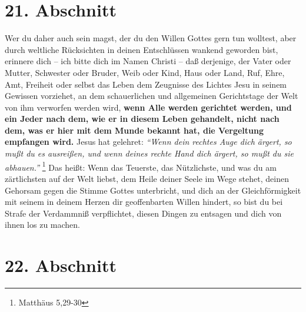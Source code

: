 \section{21. Abschnitt} \label{kap4_ab21}

Wer du daher auch sein magst, der du den Willen Gottes gern tun wolltest, aber
durch weltliche Rücksichten in deinen Entschlüssen wankend geworden bist,
erinnere dich -- ich bitte dich im Namen Christi -- daß derjenige, der Vater oder
Mutter, Schwester oder Bruder, Weib oder Kind, Haus oder Land, Ruf, Ehre, Amt,
Freiheit oder selbst das Leben dem Zeugnisse des Lichtes Jesu  in seinem
Gewissen vorziehet, an dem schauerlichen und allgemeinen Gerichtstage  der Welt
von ihm verworfen werden wird, \textbf{wenn Alle werden gerichtet werden, und
ein Jeder
nach dem, wie er in diesem Leben gehandelt, nicht nach dem, was er hier mit dem
Munde bekannt  hat, die Vergeltung empfangen wird.} Jesus hat gelehret:
\textit{"`Wenn
dein rechtes Auge dich ärgert, so mußt du es ausreißen, und wenn deines rechte
Hand dich ärgert, so mußt du sie abhauen."'}
\footnote{Matthäus  5,29-30}
Das heißt:
Wenn das Teuerste, das Nützlichste, und was du am zärtlichsten auf der Welt
liebst, dem Heile deiner Seele im Wege stehet, deinen Gehorsam gegen die Stimme
Gottes unterbricht, und dich an der Gleichförmigkeit mit seinem in deinem Herzen
dir geoffenbarten Willen hindert, so bist du bei Strafe der Verdammniß
verpflichtet, diesen Dingen zu entsagen und dich von ihnen los zu machen.

\section{22. Abschnitt} \label{kap4_ab22}

